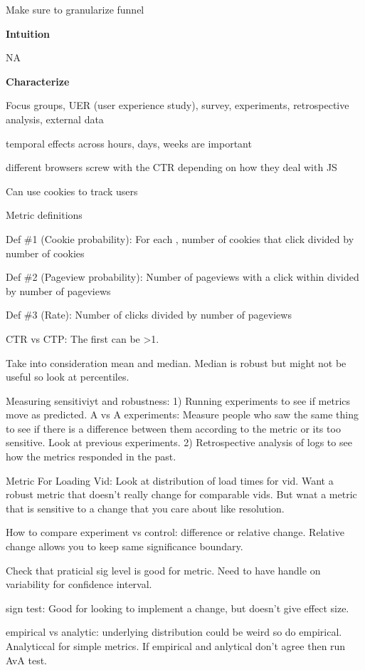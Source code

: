\documentclass[]{book}
\begin{document}
Make sure to granularize funnel

\textbf{Intuition}

NA

\textbf{Characterize}

Focus groups, UER (user experience study), survey, experiments,
retrospective analysis, external data

temporal effects across hours, days, weeks are important

different browsers screw with the CTR depending on how they deal with JS

Can use cookies to track users

Metric definitions

Def \#1 (Cookie probability): For each , number of cookies that click
divided by number of cookies

Def \#2 (Pageview probability): Number of pageviews with a click within
divided by number of pageviews

Def \#3 (Rate): Number of clicks divided by number of pageviews

CTR vs CTP: The first can be \textgreater{}1.

Take into consideration mean and median. Median is robust but might not
be useful so look at percentiles.

Measuring sensitiviyt and robustness: 1) Running experiments to see if
metrics move as predicted. A vs A experiments: Measure people who saw
the same thing to see if there is a difference between them according to
the metric or its too sensitive. Look at previous experiments. 2)
Retrospective analysis of logs to see how the metrics responded in the
past.

Metric For Loading Vid: Look at distribution of load times for vid. Want
a robust metric that doesn't really change for comparable vids. But wnat
a metric that is sensitive to a change that you care about like
resolution.

How to compare experiment vs control: difference or relative change.
Relative change allows you to keep same significance boundary.

Check that praticial sig level is good for metric. Need to have handle
on variability for confidence interval.

sign test: Good for looking to implement a change, but doesn't give
effect size.

empirical vs analytic: underlying distribution could be weird so do
empirical. Analyticcal for simple metrics. If empirical and anlytical
don't agree then run AvA test.
\end{document}

